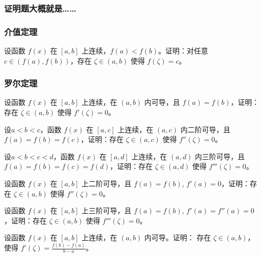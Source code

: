 \documentclass[CJK,13pt]{beamer}
\date{}
\begin{document}
  \bch

  \begin{frame}
    \frametitle{证明题大概就是……}
  \end{frame}

  
\begin{frame}
  \frametitle{介值定理}
  
  设函数 $f(x)$ 在 $[a,b]$ 上连续，$f(a) < f(b)$。证明：对任意 $c\in \left(f(a), f(b)\right)$，存在 $\zeta\in(a,b)$ 使得 $f(\zeta)=c$。
\end{frame}

  
  \begin{frame}
    \frametitle{罗尔定理}
  设函数 $f(x)$ 在 $[a,b]$ 上连续，在 $(a,b)$ 内可导，且 $f(a)=f(b)$，证明：存在 $\zeta\in(a,b)$ 使得 $f'(\zeta)=0$。
\end{frame}


\begin{frame}
  设$a<b<c$，函数 $f(x)$ 在 $[a,c]$ 上连续，在 $(a,c)$ 内二阶可导，且 $f(a)=f(b)=f(c)$，证明：存在 $\zeta\in(a,c)$ 使得 $f''(\zeta)=0$。
\end{frame}


\begin{frame}
  设$a<b<c<d$，函数 $f(x)$ 在 $[a,d]$ 上连续，在 $(a,d)$ 内三阶可导，且 $f(a)=f(b)=f(c)=f(d)$，证明：存在 $\zeta\in(a,d)$ 使得 $f'''(\zeta)=0$。
\end{frame}

\begin{frame}
\end{frame}



\begin{frame}
  设函数 $f(x)$ 在 $[a,b]$ 上二阶可导，且 $f(a)=f(b)$, $f'(a) = 0$，证明：存在 $\zeta\in(a,b)$ 使得 $f''(\zeta)=0$。
\end{frame}


\begin{frame}
  设函数 $f(x)$ 在 $[a,b]$ 上三阶可导，且 $f(a)=f(b)$, $f'(a) = f''(a) = 0$，证明：存在 $\zeta\in(a,b)$ 使得 $f'''(\zeta)=0$。
\end{frame}



\begin{frame}
  设函数 $f(x)$ 在 $[a,b]$ 上连续，在 $(a,b)$ 内可导。证明： 存在 $\zeta\in(a,b)$，使得 $f'(\zeta) = \frac{f(b)-f(a)}{b-a}$。
\end{frame}
\end{document}
